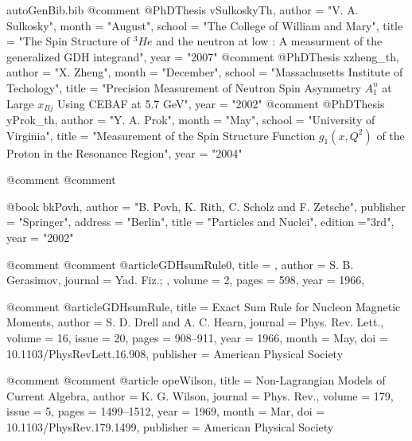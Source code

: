 \begin{filecontents*}{autoGenBib.bib}
@comment %
@PhDThesis{ vSulkoskyTh,
	author = "V. A. Sulkosky",
	month = "August",
	school = "The College of William and Mary",
	title = "{The Spin Structure of $^3He$ and the neutron at low \qsq: A measurment of the generalized GDH integrand}",
	year = "2007"
}
@comment %
@PhDThesis{ xzheng_th,
	author = "X. Zheng",
	month = "December",
	school = "Massachusetts Institute of Techology",
	title = "{Precision Measurement of Neutron Spin Asymmetry $A_1^n$ at Large $x_{Bj}$ Using CEBAF at 5.7 GeV}",
	year = "2002"
}
@comment %
@PhDThesis{ yProk_th,
	author = "Y. A. Prok",
	month = "May",
	school = "University of Virginia",
	title = "{Measurement of the Spin Structure Function $g_1(x,Q^2)$ of the Proton in the Resonance Region}",
	year = "2004"
}


@comment %
@comment %

@book{ bkPovh,
	author = "B. Povh, K. Rith, C. Scholz and F. Zetsche",
	publisher = "Springer",
	address = "Berlin",
	title = "Particles and Nuclei",
	edition ="3rd",
	year = "2002"
}

@comment %
@comment %
@article{GDHsumRule0,
  title = {},
  author = {S. B. Gerasimov},
  journal = {Yad. Fiz.; },
  volume = {2},
  pages = {598},
  year = {1966},%
}

@comment %
@article{GDHsumRule,
  title = {Exact Sum Rule for Nucleon Magnetic Moments},
  author = {S. D. Drell and A. C. Hearn},
  journal = {Phys. Rev. Lett.},
  volume = {16},
  issue = {20},
  pages = {908--911},
  year = {1966},
  month = {May},
  doi = {10.1103/PhysRevLett.16.908},
  publisher = {American Physical Society}
}

@comment %
@comment %
@article{ opeWilson,
  title = {Non-Lagrangian Models of Current Algebra},
  author = {K. G. Wilson},
  journal = {Phys. Rev.},
  volume = {179},
  issue = {5},
  pages = {1499--1512},
  year = {1969},
  month = {Mar},
  doi = {10.1103/PhysRev.179.1499},
  publisher = {American Physical Society}
}



\end{filecontents*}
